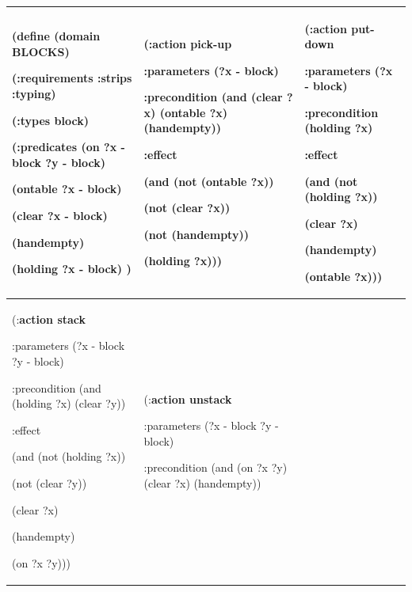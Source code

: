 \documentclass[12pt]{report}
\begin{document}
	\begin{table}
		\footnotesize
		\centering
		\begin{tabular}{|p{}|p{}|p{}|}
			\hline
			(define (\textbf{domain BLOCKS})
			
			(:requirements :strips :typing)
			
			(:types block)
			
			(:predicates (on ?x - block ?y - block)
			
			(ontable ?x - block)
			
			(clear ?x - block)
			
			(handempty)
			
			(holding ?x - block)
			)
			&
			(:\textbf{action pick-up}
			
			:parameters (?x - block)
			
			:precondition (and (clear ?x) (ontable ?x) (handempty))
			
			:effect
			
			(and (not (ontable ?x))
			
			(not (clear ?x))
			
			(not (handempty))
			
			(holding ?x)))
			&
			(:\textbf{action put-down}
			
			:parameters (?x - block)
			
			:precondition (holding ?x)
			
			:effect
			
			(and (not (holding ?x))
			
			(clear ?x)
			
			(handempty)
			
			(ontable ?x)))
			\\
			\hline
			(:\textbf{action stack}
			
			:parameters (?x - block ?y - block)
			
			:precondition (and (holding ?x) (clear ?y))
			
			:effect
			
			(and (not (holding ?x))
			
			(not (clear ?y))
			
			(clear ?x)
			
			(handempty)
			
			(on ?x ?y)))
			&
			(:\textbf{action unstack}
			
			:parameters (?x - block ?y - block)
			
			:precondition (and (on ?x ?y) (clear ?x) (handempty))
			

\end{tabular}
\end{table}
\end{document}
